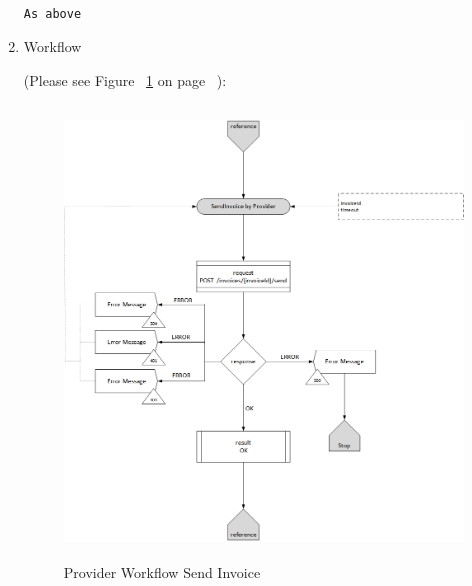 \begin{enumerate}
\begin{tcolorbox}[boxrule=0pt, frame empty]
\begin{verbatim}

As above

\end{verbatim}
\end{tcolorbox}


\item Workflow

(Please see Figure ~\ref{fig:PSI} on page ~\pageref{fig:PSI}):

\begin{figure}[htbp]
    \centering
    \includegraphics[width=12cm,height=12cm,angle=0]{./diag/Workflow/Payment/SendInvoice-P-Workflow.png}
    \caption{Provider Workflow Send Invoice }
	\label{fig:PSI}
\end{figure}


\end{enumerate}

